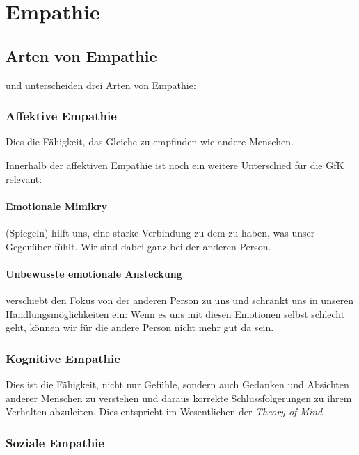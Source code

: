 \section{Empathie}
\label{empathie}

\subsection{Arten von Empathie}

\cite{shaw-empathie} und \cite[S.~100~f]{gfk-dummies} unterscheiden drei Arten von Empathie:


\subsubsection{Affektive Empathie}

Dies die Fähigkeit, das Gleiche zu empfinden wie andere Menschen.

Innerhalb der affektiven Empathie ist noch ein weitere Unterschied für die GfK relevant:

\paragraph{Emotionale Mimikry} (Spiegeln) hilft uns, eine starke Verbindung zu dem zu haben, was unser Gegenüber fühlt. Wir sind dabei ganz bei der anderen Person.

\paragraph{Unbewusste emotionale Ansteckung} verschiebt den Fokus von der anderen Person zu uns und schränkt uns in unseren Handlungsmöglichkeiten ein: Wenn es uns mit diesen Emotionen selbst schlecht geht, können wir für die andere Person nicht mehr gut da sein.


\subsubsection{Kognitive Empathie}

Dies ist die Fähigkeit, nicht nur Gefühle, sondern auch Gedanken und Absichten anderer Menschen zu verstehen und daraus korrekte Schlussfolgerungen zu ihrem Verhalten abzuleiten. Dies entspricht im Wesentlichen der \emph{Theory of Mind}.\cite{theory-of-mind-schrepfer}


\subsubsection{Soziale Empathie}

